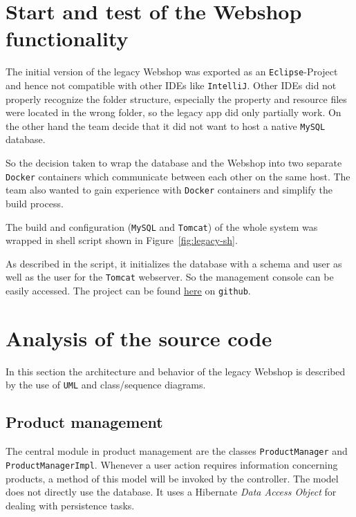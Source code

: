 \documentclass[11pt]{article}
\begin{document}
	
	\section{Start and test of the Webshop functionality}
	The initial version of the legacy Webshop was exported as an \texttt{Eclipse}-Project and hence not compatible with other IDEs like \texttt{IntelliJ}. Other IDEs did not properly recognize the folder structure, especially the property and resource files were located in the wrong folder, so the legacy app did only partially work. On the other hand the team decide that it did not want to host a native \texttt{MySQL} database.
	
	So the decision taken to wrap the database and the Webshop into two separate \texttt{Docker} containers which communicate between each other on the same host. The team also wanted to gain experience with \texttt{Docker} containers and simplify the build process.

	The build and configuration (\texttt{MySQL} and \texttt{Tomcat}) of the whole system was wrapped in shell script shown in Figure~\ref{fig:legacy-sh}.
	
	As described in the script, it initializes the database with a schema and user as well as the user for the \texttt{Tomcat} webserver. So the management console can be easily accessed. The project can be found \href{https://github.com/mavogel/vis-lab}{here} on \texttt{github}.
	
	\section{Analysis of the source code}
    In this section the architecture and behavior of the legacy Webshop is described by the use of \texttt{UML} and class/sequence diagrams.
    
    \subsection{Product management} %
	The central module in product management are the classes \texttt{ProductManager} and \texttt{ProductManagerImpl}. Whenever a user action requires information concerning products, a method of this model will be invoked by the controller. The model does not directly use the database. It uses a Hibernate \textit{Data Access Object} for dealing with persistence tasks.
\end{document}
